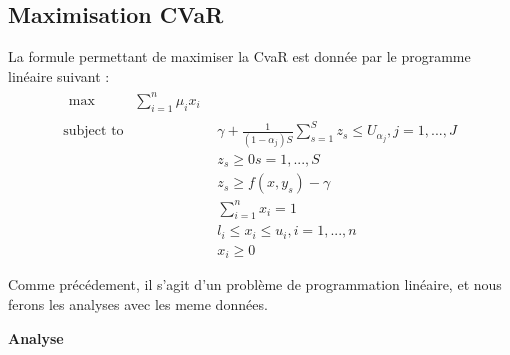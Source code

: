 \documentclass[12pt]{article}
\theoremstyle{definition}
\theoremstyle{definition}
\begin{document}
\subsection{Maximisation CVaR}
La formule permettant de maximiser la CvaR est donnée par le programme linéaire suivant :
\begin{align}
\begin{split}
\text{max}\qquad & \sum_{i=1}^{n} \mu_{i}x_{i} 
  \end{split}
\label{green} 
\\[2ex]
\text{subject to}\qquad &  \gamma + \frac{1}{(1-\alpha_{j})S} \sum_{s=1}^{S} z_{s} \leq U_{\alpha_{j}} , j = 1,...,J
\label{green-constraint-1} 
\\
& z_{s} \geq 0 s = 1,...,S 
\label{green-constraint-1} 
\\
& z_{s} \geq  f(x,y_{s}) - \gamma  
\label{green-constraint-2}
\\ & \sum_{i=1}^{n} x_{i} = 1
\label{green-constraint-4}
\\ & l_{i}\leq x_{i} \leq u_{i}, i = 1,...,n
\label{green-constraint-4}
\\ &  x_{i} \geq 0
\end{align}

Comme précédement, il s'agit d'un problème de programmation linéaire, et nous ferons les analyses avec les meme données.
\newline
\begin{center}
        \textbf{Analyse}
\end{center}
\end{document}
